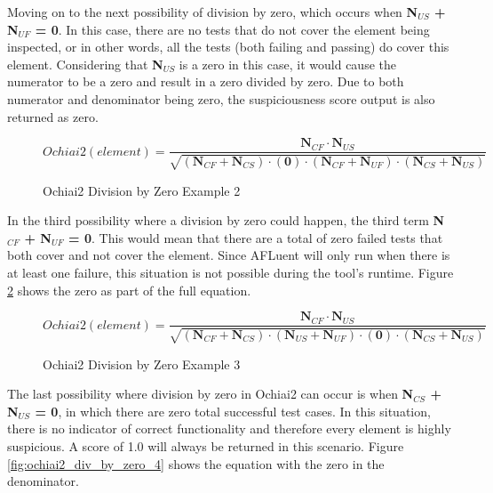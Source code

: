 Moving on to the next possibility of division by zero, which occurs when
\textbf{N$_{US}$ + N$_{UF}$ = 0}. In this case, there are no tests that do not
cover the element being inspected, or in other words, all the tests (both
failing and passing) do cover this element. Considering that \textbf{N$_{US}$}
is a zero in this case, it would cause the numerator to be a zero and result in
a zero divided by zero. Due to both numerator and denominator being zero, the
suspiciousness score output is also returned as zero.

\begin{figure}[!htb]
	\begin{center}
		\begin{equation}
			Ochiai2(element) = \frac{\textbf{N$_{CF}$}\cdot{\textbf{N$_{US}$}}}{\sqrt{(\textbf{N$_{CF}$}  + \textbf{N$_{CS}$}) \cdot (\textbf{0}) \cdot (\textbf{N$_{CF}$}  + \textbf{N$_{UF}$}) \cdot (\textbf{N$_{CS}$}  + \textbf{N$_{US}$})}}
		\end{equation}
		\caption{\label{fig:ochiai2_div_by_zero_2}  Ochiai2 Division by Zero
		Example 2}
	\end{center}
\end{figure}

In the third possibility where a division by zero could happen, the third term
\textbf{N$_{CF}$ + N$_{UF}$ = 0}. This would mean that there are a total of zero
failed tests that both cover and not cover the element. Since AFLuent will only
run when there is at least one failure, this situation is not possible during
the tool's runtime. Figure  \ref{fig:ochiai2_div_by_zero_3} shows the zero as part
of the full equation.

\begin{figure}[!htb]
	\begin{center}
		\begin{equation}
			Ochiai2(element) = \frac{\textbf{N$_{CF}$}\cdot{\textbf{N$_{US}$}}}{\sqrt{(\textbf{N$_{CF}$}  + \textbf{N$_{CS}$}) \cdot (\textbf{N$_{US}$}  + \textbf{N$_{UF}$}) \cdot (\textbf{0}) \cdot (\textbf{N$_{CS}$}  + \textbf{N$_{US}$})}}
		\end{equation}
		\caption{\label{fig:ochiai2_div_by_zero_3} Ochiai2 Division by Zero
		Example 3}
	\end{center}
\end{figure}

The last possibility where division by zero in Ochiai2 can occur is when
\textbf{N$_{CS}$ + N$_{US}$ = 0}, in which there are zero total successful test
cases. In this situation, there is no indicator of correct functionality and
therefore every element is highly suspicious. A score of 1.0 will always be
returned in this scenario. Figure  \ref{fig:ochiai2_div_by_zero_4} shows the
equation with the zero in the denominator.

